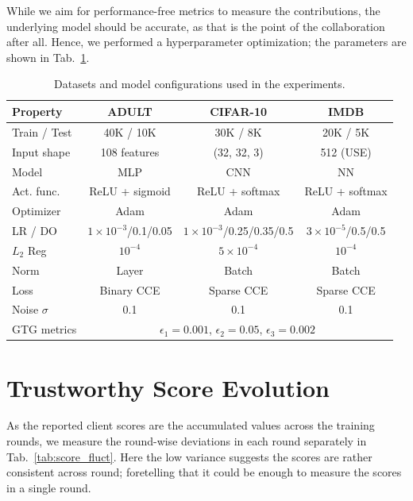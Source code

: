 \documentclass{uai2026}
\begin{document}
While we aim for performance-free metrics to measure the contributions, the underlying model should be accurate, as that is the point of the collaboration after all. Hence, we performed a hyperparameter optimization; the parameters are shown in Tab.~\ref{tab:hyper}.

\begin{table}[h]
    \centering
    \setlength{\tabcolsep}{2pt}
    \begin{tabular}{|l||c|c|c|}
        \hline
        \textbf{Property} & ADULT & \textbf{CIFAR-10} & IMDB \\
        \hline\hline
        Train / Test & 40K / 10K & 30K / 8K & 20K / 5K \\
        \hline
        Input shape & 108 features & (32, 32, 3) & 512 (USE) \\
        Model & MLP  & CNN  & NN  \\
        Act. func. & ReLU + sigmoid & ReLU + softmax & ReLU + softmax \\
        Optimizer & Adam & Adam & Adam \\
        LR / DO & $1\times10^{-3}$/0.1/0.05 & $1\times10^{-3}$/0.25/0.35/0.5 & $3\times10^{-5}$/0.5/0.5 \\
        $L_2$ Reg & $10^{-4}$ & $5\times10^{-4}$ & $10^{-4}$ \\
        Norm & Layer & Batch & Batch \\
        Loss & Binary CCE & Sparse CCE & Sparse CCE \\
        \hline
        Noise $\sigma$ & 0.1 & 0.1 & 0.1 \\
        \hline
        GTG metrics & \multicolumn{3}{c}{ $\epsilon_1=0.001$, $\epsilon_2=0.05$, $\epsilon_3=0.002$ } \\
        \hline
    \end{tabular}
    \caption{Datasets and model configurations used in the experiments.}
    \label{tab:hyper}
\end{table}

\section{Trustworthy Score Evolution}
\label{app:evol}

As the reported client scores are the accumulated values across the training rounds, we measure the round-wise deviations in each round separately in Tab.~\ref{tab:score_fluct}. Here the low variance suggests the scores are rather consistent across round; foretelling that it could be enough to measure the scores in a single round.
\end{document}
